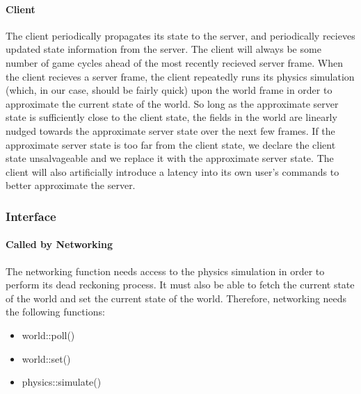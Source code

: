 \documentclass[12pt]{article}
\begin{document}

\paragraph{Client} The client periodically propagates its state to the server, and periodically recieves updated state information from the server.  The client will always be some number of game cycles ahead of the most recently recieved server frame.  When the client recieves a server frame, the client repeatedly runs its physics simulation (which, in our case, should be fairly quick) upon the world frame in order to approximate the current state of the world.  So long as the approximate server state is sufficiently close to the client state, the fields in the world are linearly nudged towards the approximate server state over the next few frames.  If the approximate server state is too far from the client state, we declare the client state unsalvageable and we replace it with the approximate server state.  The client will also artificially introduce a latency into its own user's commands to better approximate the server.
 
\subsubsection{Interface}

\paragraph{Called by Networking}
The networking function needs access to the physics simulation in order to perform its dead reckoning process.  It must also be able to fetch the current state of the world and set the current state of the world.  Therefore, networking needs the following functions:
\begin{itemize} 
\item world::poll()
\item world::set()
\item physics::simulate()
\end{itemize}
\end{document}

